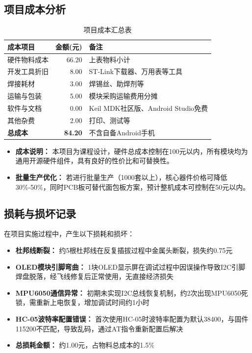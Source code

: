 \subsection{项目成本分析}
\begin{table}[h]
    \centering
    \caption{项目成本汇总表}
    \begin{tabular}{|l|r|l|}
        \hline
        \textbf{成本项目} & \textbf{金额(元)} & \textbf{备注} \\ \hline
        硬件物料成本 & 66.20 & 上表物料小计 \\ \hline
        开发工具折旧 & 8.00 & ST-Link下载器、万用表等工具 \\ \hline
        焊接耗材 & 3.00 & 焊锡丝、助焊剂等 \\ \hline
        运输与包装 & 5.00 & 模块采购运输费用分摊 \\ \hline
        软件与文档 & 0.00 & Keil MDK社区版、Android Studio免费 \\ \hline
        其他杂费 & 2.00 & 打印、测试等 \\ \hline
        \textbf{总成本} & \textbf{84.20} & 不含自备Android手机 \\ \hline
    \end{tabular}
\end{table}

\begin{itemize}
    \item \textbf{成本说明：} 本项目为课程设计，硬件总成本控制在100元以内，所有模块均为通用开源硬件组件，具有良好的性价比和可替换性。
    \item \textbf{批量生产优化：} 若进行批量生产（1000套以上），核心器件价格可降低30\%-50\%，同时PCB板可替代面包板方案，预计整机成本可控制在50元以内。
\end{itemize}

\subsection{损耗与损坏记录}
在项目实施过程中，产生以下损耗和损坏：
\begin{itemize}
    \item \textbf{杜邦线断裂：} 约5根杜邦线在反复插拔过程中金属头断裂，损失约0.75元
    \item \textbf{OLED模块引脚弯曲：} 1块OLED显示屏在调试过程中因误操作导致I2C引脚焊盘脱落，经飞线修复后正常使用，无直接经济损失
    \item \textbf{MPU6050通信异常：} 初期未实现I2C总线恢复机制，约2次出现MPU6050死锁，需重新上电恢复，增加调试时间约1小时
    \item \textbf{HC-05波特率配置错误：} 首次使用HC-05时波特率配置为默认38400，与固件115200不匹配，导致乱码，通过AT指令重新配置后解决
    \item \textbf{总损耗金额：} 约1.00元，占物料总成本的1.5\%
\end{itemize}

